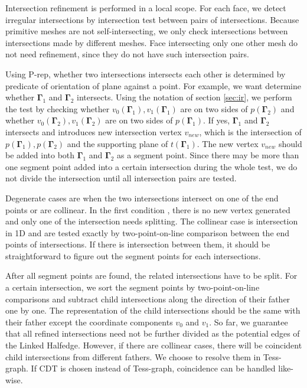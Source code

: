 \documentclass[10pt,journal,compsoc]{IEEEtran}
\begin{document}
Intersection refinement is performed in a local scope. For each face, we detect irregular intersections by intersection test between pairs of intersections. Because primitive meshes are not self-intersecting, we only check intersections between intersections made by different meshes. Face intersecting only one other mesh do not need refinement, since they do not have such intersection pairs.

Using P-rep, whether two intersections intersects each other is determined by predicate of orientation of plane against a point. For example, we want determine whether ${\boldsymbol{\Gamma}}_1$ and ${\boldsymbol{\Gamma}}_2$ intersects. Using the notation of section \ref{sec:ir}, we perform the test by checking whether $v_0({\boldsymbol{\Gamma}}_1), v_1({\boldsymbol{\Gamma}}_1)$ are on two sides of $p({\boldsymbol{\Gamma}}_2)$ and whether $v_0({\boldsymbol{\Gamma}}_2), v_1({\boldsymbol{\Gamma}}_2)$ are on two sides of $p({\boldsymbol{\Gamma}}_1)$. If yes, ${\boldsymbol{\Gamma}}_1$ and ${\boldsymbol{\Gamma}}_2$ intersects and introduces new intersection vertex $v_{new}$, which is the intersection of $p({\boldsymbol{\Gamma}}_1), p({\boldsymbol{\Gamma}}_2)$ and the supporting plane of $t({\boldsymbol{\Gamma}}_1)$. The new vertex $v_{new}$ should be added into both ${\boldsymbol{\Gamma}}_1$ and ${\boldsymbol{\Gamma}}_2$ as a segment point. Since there may be more than one segment point added into a certain intersection during the whole test, we do not divide the intersection until all intersection pairs are tested.

Degenerate cases are when the two intersections intersect on one of the end points or are collinear. In the first condition {\color{red}{Fig. ??(a)}}, there is no new vertex generated and only one of the intersection needs splitting. The collinear case {\color{red}{Fig. ??(b)}} is intersection in 1D and are tested exactly by two-point-on-line comparison between the end points of intersections. If there is intersection between them, it should be straightforward to figure out the segment points for each intersections.

After all segment points are found, the related intersections have to be split. For a certain intersection, we sort the segment points by two-point-on-line comparisons and subtract child intersections along the direction of their father one by one. The representation of the child intersections should be the same with their father except the coordinate components $v_0$ and $v_1$. So far, we guarantee that all refined intersections need not be further divided as the potential edges of the Linked Halfedge. However, if there are collinear cases, there will be coincident child intersections from different fathers. We choose to resolve them in Tess-graph. If CDT is chosen instead of Tess-graph, coincidence can be handled like-wise.
\end{document}
